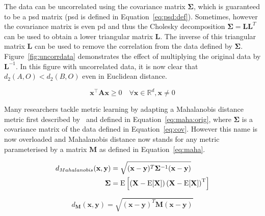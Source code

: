 \documentclass[12pt,a4paper]{report}
\begin{document}

The data can be uncorrelated using the covariance matrix $\bm{\Sigma}$, which is guaranteed to be a \ac{psd} matrix (\ac{psd} is defined in Equation~\ref{eq:psd:def}). Sometimes, however the covariance matrix is even \ac{pd} and thus the Cholesky decomposition $\bm{\Sigma}=\bm{L}\bm{L}^T$ can be used to obtain a lower triangular matrix $\bm{L}$. The inverse of this triangular matrix $\bm{L}$ can be used to remove the correlation from the data defined by $\bm{\Sigma}$. Figure~\ref{fig:uncorrdata} demonstrates the effect of multiplying the original data by $\bm{L}^{-1}$. In this figure with uncorrelated data, it is now clear that $d_2(A,O)<d_2(B,O)$ even in Euclidean distance.

\begin{equation}
\bm{x}^\top \bm{A}\bm{x} \geq 0 \quad \forall \bm{x} \in \mathbb{R}^d, \bm{x} \neq 0 \label{eq:psd:def}
\end{equation}


Many researchers tackle metric learning by adapting a Mahalanobis distance metric first described by~\citep{mahalanobis1936generalized} and defined in Equation~\ref{eq:maha:orig}, where $\bm{\Sigma}$ is a covariance matrix of the data defined in Equation~\ref{eq:cov}. However this name is now overloaded and Mahalanobis distance now stands for any metric parameterised by a matrix $\bm{M}$ as defined in Equation~\ref{eq:maha}.

\begin{align} \label{eq:maha:orig}
d_{Mahalanobis}(\textbf{x},\textbf{y}) &= \sqrt{(\textbf{x}-\textbf{y})^T\bm{\Sigma}^{-1}(\textbf{x}-\textbf{y})}  \\
\bm{\Sigma} &= \mathrm {E} \left[\left(\mathbf {X} -\mathrm {E} [\mathbf {X} ]\right)\left(\mathbf {X} -\mathrm {E} [\mathbf {X} ]\right)^{\rm {T}}\right] \label{eq:cov}
\end{align}

\begin{equation} \label{eq:maha}
d_{\bm{M}}(\textbf{x},\textbf{y}) = \sqrt{(\textbf{x}-\textbf{y})^T\bm{M}(\textbf{x}-\textbf{y})} 
\end{equation}
\end{document}
